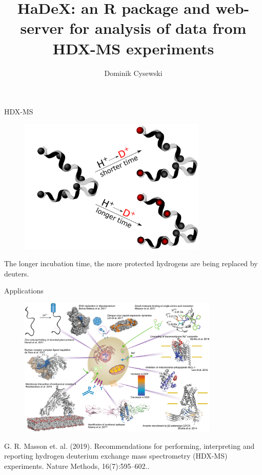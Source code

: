 \documentclass{beamer}\usepackage[]{graphicx}\usepackage[]{color}
\title{HaDeX: an R package and \mbox{web-server} for analysis of \mbox{data} from HDX-MS experiments}
\date{}
\author{Dominik Cysewski}
\institute{Institute of Biochemistry and Biophysics \\ Polish Academy of Sciences}
\begin{document}
\maketitle

\begin{frame}{HDX-MS}

\begin{figure} 
\includegraphics[width=0.80\textwidth]{static_figure/HDX-2.pdf}
\end{figure}

The longer incubation time, the more protected hydrogens are being replaced by deuters.

\end{frame}

\begin{frame}{Applications}

\begin{figure} 
\includegraphics[width=0.85\textwidth]{static_figure/hdx-applications.png}
\end{figure}


\tiny G. R. Masson et. al. (2019).
Recommendations for performing, interpreting and reporting
hydrogen deuterium exchange mass spectrometry (HDX-MS)
experiments. Nature Methods, 16(7):595–602..

\end{frame}
\end{document}
